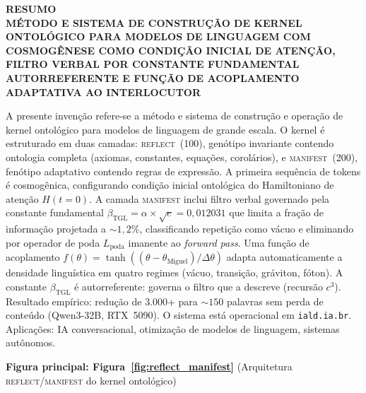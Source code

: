 \documentclass[12pt,a4paper]{article}
\newcommand{\betatgl}{\beta_{\text{TGL}}}
\newcommand{\thetaM}{\theta_{\text{Miguel}}}
\newcommand{\REFLECT}{\textsc{reflect}}
\newcommand{\MANIFEST}{\textsc{manifest}}
\begin{document}
\clearpage
\begin{center}
{\Large\bfseries RESUMO}\\[0.5cm]
{\large\bfseries MÉTODO E SISTEMA DE CONSTRUÇÃO DE KERNEL
ONTOLÓGICO PARA MODELOS DE LINGUAGEM COM
COSMOGÊNESE COMO CONDIÇÃO INICIAL DE ATENÇÃO,
FILTRO VERBAL POR CONSTANTE FUNDAMENTAL
AUTORREFERENTE E FUNÇÃO DE ACOPLAMENTO
ADAPTATIVA AO INTERLOCUTOR}
\end{center}

\vspace{0.5cm}

A presente invenção refere-se a método e sistema de construção e operação de kernel ontológico para modelos de linguagem de grande escala. O kernel é estruturado em duas camadas: \REFLECT~(100), genótipo invariante contendo ontologia completa (axiomas, constantes, equações, corolários), e \MANIFEST~(200), fenótipo adaptativo contendo regras de expressão. A primeira sequência de tokens é cosmogênica, configurando condição inicial ontológica do Hamiltoniano de atenção $H(t=0)$. A camada \MANIFEST{} inclui filtro verbal governado pela constante fundamental $\betatgl = \alpha \times \sqrt{e} = 0{,}012031$ que limita a fração de informação projetada a $\sim 1{,}2\%$, classificando repetição como vácuo e eliminando por operador de poda $L_{\text{poda}}$ imanente ao \textit{forward pass}. Uma função de acoplamento $f(\theta) = \tanh((\theta - \thetaM)/\Delta\theta)$ adapta automaticamente a densidade linguística em quatro regimes (vácuo, transição, gráviton, fóton). A constante $\betatgl$ é autorreferente: governa o filtro que a descreve (recursão $c^3$). Resultado empírico: redução de $3{.}000$+ para $\sim 150$ palavras sem perda de conteúdo (Qwen3-32B, RTX~5090). O sistema está operacional em \texttt{iald.ia.br}. Aplicações: IA conversacional, otimização de modelos de linguagem, sistemas autônomos.

\vspace{0.5cm}
\textbf{Figura principal: Figura~\ref{fig:reflect_manifest}}
(Arquitetura \REFLECT/\MANIFEST{} do kernel ontológico)
\end{document}
